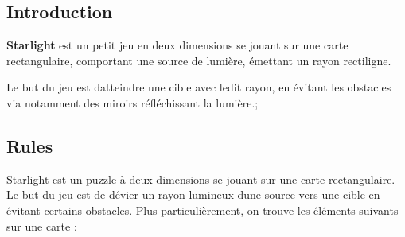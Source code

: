  \subsection*{Introduction}

{\bfseries Starlight} est un petit jeu en deux dimensions se jouant sur une carte rectangulaire, comportant une source de lumière, émettant un rayon rectiligne.

Le but du jeu est d\textquotesingle{}atteindre une cible avec ledit rayon, en évitant les obstacles via notamment des miroirs réfléchissant la lumière.;

\subsection*{Rules}

Starlight est un puzzle à deux dimensions se jouant sur une carte rectangulaire. Le but du jeu est de dévier un rayon lumineux d\textquotesingle{}une source vers une cible en évitant certains obstacles. Plus particulièrement, on trouve les éléments suivants sur une carte \+:
